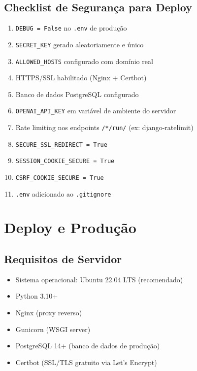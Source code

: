 \documentclass[12pt, a4paper, oneside]{report}
\begin{document}
\section{Checklist de Segurança para Deploy}

\begin{enumerate}
  \item[$\square$] \texttt{DEBUG = False} no \texttt{.env} de produção
  \item[$\square$] \texttt{SECRET\_KEY} gerado aleatoriamente e único
  \item[$\square$] \texttt{ALLOWED\_HOSTS} configurado com domínio real
  \item[$\square$] HTTPS/SSL habilitado (Nginx + Certbot)
  \item[$\square$] Banco de dados PostgreSQL configurado
  \item[$\square$] \texttt{OPENAI\_API\_KEY} em variável de ambiente do servidor
  \item[$\square$] Rate limiting nos endpoints \texttt{/*/run/} (ex: django-ratelimit)
  \item[$\square$] \texttt{SECURE\_SSL\_REDIRECT = True}
  \item[$\square$] \texttt{SESSION\_COOKIE\_SECURE = True}
  \item[$\square$] \texttt{CSRF\_COOKIE\_SECURE = True}
  \item[$\square$] \texttt{.env} adicionado ao \texttt{.gitignore}
\end{enumerate}

\chapter{Deploy e Produção}

\section{Requisitos de Servidor}

\begin{itemize}
  \item Sistema operacional: Ubuntu 22.04 LTS (recomendado)
  \item Python 3.10+
  \item Nginx (proxy reverso)
  \item Gunicorn (WSGI server)
  \item PostgreSQL 14+ (banco de dados de produção)
  \item Certbot (SSL/TLS gratuito via Let's Encrypt)
\end{itemize}
\end{document}
